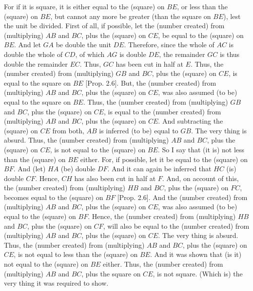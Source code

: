 \begin{Parallel}{}{}
{For if it is square, it is either equal to the (square) on $BE$, or
less than the (square) on $BE$, but cannot    any more be greater  (than the square on $BE$), lest the unit be divided. First of all, if possible, let the
(number created) from (multiplying) $AB$ and $BC$, plus the (square) on
$CE$, be equal to the (square) on $BE$. And let $GA$ be double the unit
$DE$. Therefore, since the whole of $AC$ is double the whole
of $CD$, of which $AG$ is double $DE$, the remainder $GC$
is thus double the remainder $EC$. Thus, $GC$ has been cut in half at $E$.
Thus, the (number created) from (multiplying) $GB$ and $BC$,
plus the (square) on $CE$, is equal to the square on $BE$ [Prop. 2.6]. But, the (number created) from (multiplying) $AB$ and $BC$, plus the (square) on $CE$, was also assumed
 (to be) equal to the square on $BE$. Thus, the (number created) from
 (multiplying) $GB$ and $BC$, plus the (square) on $CE$, is equal to
 the (number created) from (multiplying)  $AB$ and $BC$, plus the
 (square) on $CE$. And subtracting the (square) on $CE$ from both, $AB$ is  inferred (to be) equal to $GB$. The very thing is absurd. Thus, the (number created) from (multiplying) $AB$ and $BC$, plus the (square) on
$CE$, is not equal to the (square) on $BE$. So I say that (it is) not
less than the (square) on $BE$ either. For, if possible, let it be equal to
the (square) on $BF$. And (let) $HA$ (be) double $DF$. And it
can again be inferred that $HC$ (is) double $CF$. Hence, $CH$ has
also been cut in half at $F$. And, on account of this, the (number created)
from (multiplying) $HB$ and $BC$, plus the (square) on $FC$, becomes
equal to the (square) on $BF$ [Prop. 2.6]. 
And the (number created) from (multiplying) $AB$ and $BC$, plus the
(square) on $CE$, was also
assumed (to be) equal to the (square) on $BF$.
Hence,
the (number created) from (multiplying) $HB$ and $BC$, plus the
(square) on $CF$, will also be equal to the
(number created) from (multiplying) $AB$ and $BC$, plus the (square) on $CE$. The very thing is
absurd. Thus, the (number created) from (multiplying) $AB$ and $BC$,
plus the (square) on $CE$, is not equal to less than the
(square) on $BE$. And it was shown that  (is it) not equal to the (square)
on $BE$ either. Thus, the (number created) from (multiplying)
$AB$ and $BC$, plus the  square on $CE$, is not square. (Which is)
the very thing it was required to show.}
\end{Parallel}

